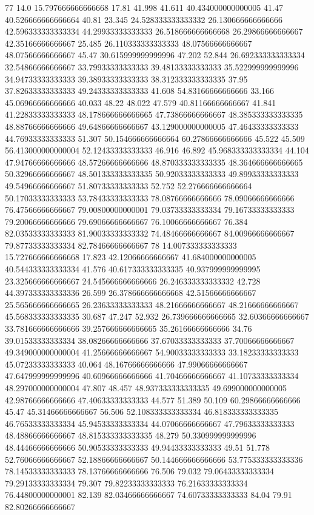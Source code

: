 77 14.0 15.797666666666668 17.81 41.998 41.611 40.434000000000005 41.47 40.526666666666664 40.81 23.345 24.528333333333332 26.130666666666666 42.596333333333334 44.29933333333333 26.518666666666668 26.29866666666667 42.35166666666667 25.485 26.110333333333333 48.07566666666667 48.07566666666667 45.47 30.615999999999996 47.202 52.844 26.692333333333334 32.54866666666667 33.79933333333333 39.48133333333333 35.522999999999996 34.94733333333333 39.38933333333333 38.312333333333335 37.95 37.82633333333333 49.24333333333333 41.608 54.83166666666666 33.166 45.06966666666666 40.033 48.22 48.022 47.579 40.81166666666667 41.841 41.22833333333333 48.178666666666665 47.73866666666667 48.385333333333335 48.88766666666666 49.64866666666667 43.129000000000005 47.46433333333333 44.76933333333333 51.307 50.154666666666664 60.27866666666666 45.522 45.509 56.413000000000004 52.12433333333333 46.916 46.892 45.968333333333334 44.104 47.94766666666666 48.57266666666666 48.870333333333335 48.364666666666665 50.32966666666667 48.501333333333335 50.92033333333333 49.89933333333333 49.54966666666667 51.80733333333333 52.752 52.276666666666664 50.17033333333333 53.78433333333333 78.08766666666666 78.09066666666666 76.47566666666667 79.00800000000001 79.03733333333334 79.16733333333333 79.20066666666666 79.69066666666667 76.10066666666667 76.384 82.03533333333333 81.90033333333332 74.48466666666667 84.00966666666667 79.87733333333334 82.78466666666667
78 14.007333333333333 15.727666666666668 17.823 42.12066666666667 41.684000000000005 40.544333333333334 41.576 40.617333333333335 40.937999999999995 23.325666666666667 24.545666666666666 26.246333333333332 42.728 44.397333333333336 26.599 26.378666666666668 42.51566666666667 25.565666666666665 26.23633333333333 48.21666666666667 48.21666666666667 45.568333333333335 30.687 47.247 52.932 26.739666666666665 32.60366666666667 33.781666666666666 39.257666666666665 35.26166666666666 34.76 39.01533333333334 38.08266666666666 37.67033333333333 37.70066666666667 49.349000000000004 41.25666666666667 54.90033333333333 33.18233333333333 45.07233333333333 40.064 48.16766666666666 47.99066666666667 47.647999999999996 40.60966666666666 41.70466666666667 41.10733333333334 48.297000000000004 47.807 48.457 48.937333333333335 49.699000000000005 42.98766666666666 47.40633333333333 44.577 51.389 50.109 60.29866666666666 45.47 45.31466666666667 56.506 52.108333333333334 46.818333333333335 46.76533333333334 45.94533333333334 44.07066666666667 47.79633333333333 48.48866666666667 48.815333333333335 48.279 50.330999999999996 48.44466666666666 50.90533333333333 49.94433333333333 49.51 51.778 52.76066666666667 52.18866666666667 50.144666666666666 53.775333333333336 78.14533333333333 78.13766666666666 76.506 79.032 79.06433333333334 79.29133333333334 79.307 79.82233333333333 76.21633333333334 76.44800000000001 82.139 82.03466666666667 74.60733333333333 84.04 79.91 82.80266666666667
